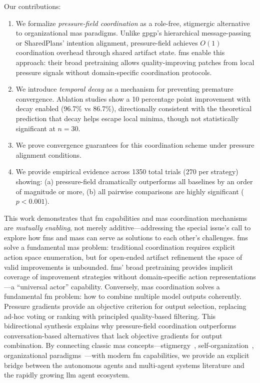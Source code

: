 Our contributions:

\begin{enumerate}
\item We formalize \emph{pressure-field coordination} as a role-free, stigmergic alternative to organizational \ac{mas} paradigms. Unlike \ac{gpgp}'s hierarchical message-passing or SharedPlans' intention alignment, pressure-field achieves $O(1)$ coordination overhead through shared artifact state. \Acp{fm} enable this approach: their broad pretraining allows quality-improving patches from local pressure signals without domain-specific coordination protocols.

\item We introduce \emph{temporal decay} as a mechanism for preventing premature convergence. Ablation studies show a 10 percentage point improvement with decay enabled (96.7\% vs 86.7\%), directionally consistent with the theoretical prediction that decay helps escape local minima, though not statistically significant at $n=30$.

\item We prove convergence guarantees for this coordination scheme under pressure alignment conditions.

\item We provide empirical evidence across 1350 total trials (270 per strategy) showing: (a) pressure-field dramatically outperforms all baselines by an order of magnitude or more, (b) all pairwise comparisons are highly significant ($p < 0.001$).
\end{enumerate}

This work demonstrates that \ac{fm} capabilities and \ac{mas} coordination mechanisms are \emph{mutually enabling}, not merely additive---addressing the special issue's call to explore how \acp{fm} and \acp{mas} can serve as solutions to each other's challenges. \Acp{fm} solve a fundamental \ac{mas} problem: traditional coordination requires explicit action space enumeration, but for open-ended artifact refinement the space of valid improvements is unbounded. \Acp{fm}' broad pretraining provides implicit coverage of improvement strategies without domain-specific action representations---a ``universal actor'' capability. Conversely, \ac{mas} coordination solves a fundamental \ac{fm} problem: how to combine multiple model outputs coherently. Pressure gradients provide an objective criterion for output selection, replacing ad-hoc voting or ranking with principled quality-based filtering. This bidirectional synthesis explains why pressure-field coordination outperforms conversation-based alternatives that lack objective gradients for output combination. By connecting classic \ac{mas} concepts---stigmergy~\cite{grasse1959stigmergie}, self-organization~\cite{dewolf2005engineering,serugendo2005selforganisation}, organizational paradigms~\cite{horling2004survey}---with modern \ac{fm} capabilities, we provide an explicit bridge between the autonomous agents and multi-agent systems literature and the rapidly growing \ac{llm} agent ecosystem.
